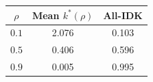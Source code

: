 \begin{tabular}{ccc}
\toprule
$\rho$ & Mean $k^*(\rho)$ & All-IDK\\
\midrule
$0.1$ & 2.076 & 0.103\\
$0.5$ & 0.406 & 0.596\\
$0.9$ & 0.005 & 0.995\\
\bottomrule
\end{tabular}
